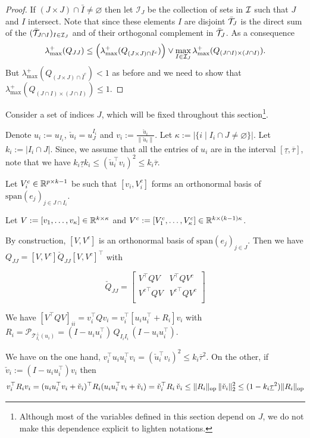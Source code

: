 \documentclass{article}
\begin{document}
\begin{proof}
If $(J \times J) \cap \bar{I} \neq \varnothing$ then let $\mathcal{I}_{J}$ be the collection of sets in $\mathcal{I}$ such that $J$ and $I$ intersect. Note that since these elements $I$ are disjoint $\bar{\mathcal{T}}_J$ is the direct sum of the $(\bar{\mathcal{T}}_{J\cap I})_{I \in \mathcal{I}_{J}}$ and of their orthogonal complement in $\bar{\mathcal{T}}_J$.
As a consequence
$$\lambda_{\max}^+(Q_{JJ}) \leq \Big ( \lambda_{\max}^+(Q_{(J \times J) \cap \bar{I}^c}) \Big ) \vee \max_{I \in \mathcal{I}_{J}} \lambda_{\max}^+(Q_{(J\cap I) \times (J \cap I)}).$$
But $\lambda_{\max}^+(Q_{(J \times J) \cap \bar{I}^c}) <1$ as before and 
we need to show that $\lambda_{\max}^+(Q_{(J\cap I) \times (J \cap I)}) \leq 1.$
\EET
\end{proof}

Consider a set of indices $J$, which will be fixed throughout this section\footnote{Although most of the variables defined in this section depend on $J$, we do not make this dependence explicit to lighten notations.}.

Denote $u_i:=u_{I_i}$, $\check{u}_i=u^{I_i}_J$ and $v_i:=\frac{\check{u}_i}{\|\check{u}_i\|}$. Let $\kappa:=|\{i \mid I_i \cap J \neq \varnothing\}|.$ Let $k_i:=|I_i \cap J|$. Since, we assume that all the entries of $u_i$ are in the interval $[\underline{\tau}, \overline{\tau}]$, note that we have $k_i \underline{\tau} k_i \leq (\check{u}_i^\top v_i)^2 \leq k_i \overline{\tau}$.

Let $V_i^c \in \mathbb{R}^{p \times k-1}$ be such that $[v_i, V_i^c]$ forms an orthonormal basis of $\text{span}(e_j)_{j \in J \cap I_i}$. 

Let $V:=[v_1,\ldots,v_\kappa] \in \mathbb{R}^{k \times \kappa}$ and $V^c:=[V_1^c,\ldots, V^c_\kappa] \in \mathbb{R}^{k \times   (k-1) \kappa}$. 

By construction, $[V,V^c]$ is an orthonormal basis of $\text{span}(e_j)_{j \in J}$.
Then we have $Q_{JJ}=[V,V^c] \check{Q}_{JJ} [V,V^c]^\top$ with

$$\check{Q}_{JJ}=
\begin{bmatrix}
V^\top Q V & V^\top Q V^c\\
{V^c}^\top Q V & {V^c}^\top Q V^c\\
\end{bmatrix}
$$

We have $[V^\top Q V]_{ii}=v_i^\top Q v_i=v_i^\top [u_i u_i^\top+R_i] v_i$
with $R_i=\mathcal{P}_{\mathcal{T}^{\bot}_{I_i}(u_i)}=(I-u_i u_i^\top)\, Q_{I_iI_i}\,  (I-u_i u_i^\top).$

We have on the one hand, $v_i^\top u_i u_i^\top v_i=(\check{u}_i^\top v_i)^2 \leq k_i \overline{\tau}^2$. On the other, if $\check{v}_i:=(I-u_iu_i^\top) v_i$ then 
$$v_i^\top R_i v_i=(u_i u_i^\top v_i +\check{v}_i)^\top R_i (u_i u_i^\top v_i +\check{v}_i)=\check{v}_i^\top R_i \, \check{v}_i \leq \|R_i\|_{{\rm op}} \, \|\check{v}_i\|^2_2 \leq (1-k_i\underline{\tau}^2) \|R_i\|_{{\rm op}}$$
\end{document}
